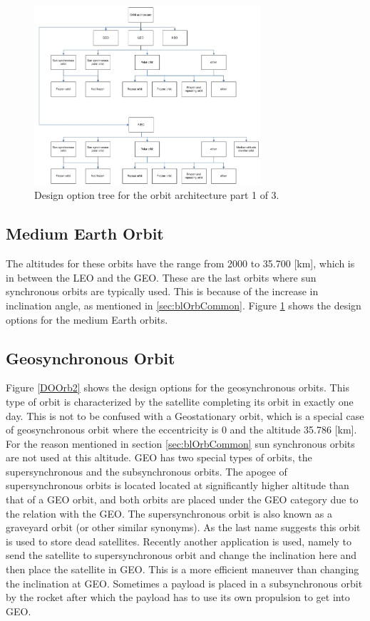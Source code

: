 \begin{figure}
\centering
  \includegraphics[width=0.75\textwidth,angle=0]{chapters/img/blDOOrb1.jpg}
	\caption{Design option tree for the orbit architecture part 1 of 3.}
	\label{DOOrb1}
\end{figure}

\subsection{Medium Earth Orbit}
\label{sec:blOrb2}
The altitudes for these orbits have the range from 2000 to 35.700 [km], which is in between the \acs{LEO} and the \ac{GEO}. These are the last orbits where sun synchronous orbits are typically used. This is because of the increase in inclination angle, as mentioned in \ref{sec:blOrbCommon}. Figure \ref{DOOrb1} shows the design options for the medium Earth orbits.

\subsection{Geosynchronous Orbit}
\label{sec:blOrb3}
Figure \ref{DOOrb2} shows the design options for the geosynchronous orbits.
This type of orbit is characterized by the satellite completing its orbit in exactly one day. This is not to be confused with a Geostationary orbit, which is a special case of geosynchronous orbit where the eccentricity is 0 and the altitude 35.786 [km].
For the reason mentioned in section \ref{sec:blOrbCommon} sun synchronous orbits are not used at this altitude. \acs{GEO} has two special types of orbits, the supersynchronous and the subsynchronous orbits. 
The apogee of supersynchronous orbits is located located at significantly higher altitude than that of a \acs{GEO} orbit, and both orbits are placed under the \acs{GEO} category due to the relation with the \acs{GEO}. The supersynchronous orbit is also known as a graveyard orbit (or other similar synonyms). As the last name suggests this orbit is used to store dead satellites. Recently another application is used, namely to send the satellite to supersynchronous orbit and change the inclination here and then place the satellite in \acs{GEO}. This is a more efficient maneuver than changing the inclination at \acs{GEO}\cite{jerOrbit}. 
Sometimes a payload is placed in a subsynchronous orbit by the rocket after which the payload has to use its own propulsion to get into \acs{GEO}.

